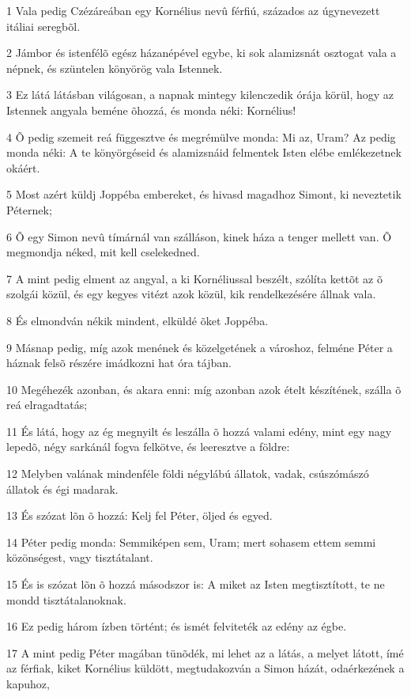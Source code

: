 \par 1 Vala pedig Czézáreában egy Kornélius nevû férfiú, százados az úgynevezett itáliai seregbõl.
\par 2 Jámbor és istenfélõ egész házanépével egybe, ki sok alamizsnát osztogat vala a népnek, és szüntelen könyörög vala Istennek.
\par 3 Ez látá látásban világosan, a napnak mintegy kilenczedik órája körül, hogy az Istennek angyala beméne õhozzá, és monda néki: Kornélius!
\par 4 Õ pedig szemeit reá függesztve és megrémülve monda: Mi az, Uram? Az pedig monda néki: A te könyörgéseid és alamizsnáid felmentek Isten elébe emlékezetnek okáért.
\par 5 Most azért küldj Joppéba embereket, és hivasd magadhoz Simont, ki neveztetik Péternek;
\par 6 Õ egy Simon nevû tímárnál van szálláson, kinek háza a tenger mellett van. Õ megmondja néked, mit kell cselekedned.
\par 7 A mint pedig elment az angyal, a ki Kornéliussal beszélt, szólíta kettõt az õ szolgái közül, és egy kegyes vitézt azok közül, kik rendelkezésére állnak vala.
\par 8 És elmondván nékik mindent, elküldé õket Joppéba.
\par 9 Másnap pedig, míg azok menének és közelgetének a városhoz, felméne Péter a háznak felsõ részére imádkozni hat óra tájban.
\par 10 Megéhezék azonban, és akara enni: míg azonban azok ételt készítének, szálla õ reá elragadtatás;
\par 11 És látá, hogy az ég megnyilt és leszálla õ hozzá valami edény, mint egy nagy lepedõ, négy sarkánál fogva felkötve, és leeresztve a földre:
\par 12 Melyben valának mindenféle földi négylábú állatok, vadak, csúszómászó állatok és égi madarak.
\par 13 És szózat lõn õ hozzá: Kelj fel Péter, öljed és egyed.
\par 14 Péter pedig monda: Semmiképen sem, Uram; mert sohasem ettem semmi közönségest, vagy tisztátalant.
\par 15 És is szózat lõn õ hozzá másodszor is: A miket az Isten megtisztított, te ne mondd tisztátalanoknak.
\par 16 Ez pedig három ízben történt; és ismét felviteték az edény az égbe.
\par 17 A mint pedig Péter magában tünõdék, mi lehet az a látás, a melyet látott, ímé az férfiak, kiket Kornélius küldött, megtudakozván a Simon házát, odaérkezének a kapuhoz,
